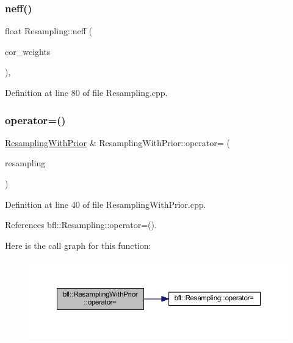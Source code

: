 \subsubsection{\texorpdfstring{neff()}{neff()}}
{\footnotesize\ttfamily float Resampling\+::neff (\begin{DoxyParamCaption}\item[{const Eigen\+::\+Ref$<$ const Eigen\+::\+Vector\+Xf $>$ \&}]{cor\+\_\+weights }\end{DoxyParamCaption})\hspace{0.3cm}{\ttfamily [virtual]}, {\ttfamily [inherited]}}



Definition at line 80 of file Resampling.\+cpp.

\mbox{\label{classbfl_1_1ResamplingWithPrior_a79ed56028dc2f97f0fb400a481998010}} 
\subsubsection{\texorpdfstring{operator=()}{operator=()}}
{\footnotesize\ttfamily \mbox{\hyperlink{classbfl_1_1ResamplingWithPrior}{Resampling\+With\+Prior}} \& Resampling\+With\+Prior\+::operator= (\begin{DoxyParamCaption}\item[{\mbox{\hyperlink{classbfl_1_1ResamplingWithPrior}{Resampling\+With\+Prior}} \&\&}]{resampling }\end{DoxyParamCaption})\hspace{0.3cm}{\ttfamily [noexcept]}}



Definition at line 40 of file Resampling\+With\+Prior.\+cpp.



References bfl\+::\+Resampling\+::operator=().

Here is the call graph for this function\+:
\nopagebreak
\begin{figure}[H]
\begin{center}
\leavevmode
\includegraphics[width=350pt]{classbfl_1_1ResamplingWithPrior_a79ed56028dc2f97f0fb400a481998010_cgraph}
\end{center}
\end{figure}
\mbox{\label{classbfl_1_1ResamplingWithPrior_a440090305ac024e1f5ad06fd36cccd34}} 
